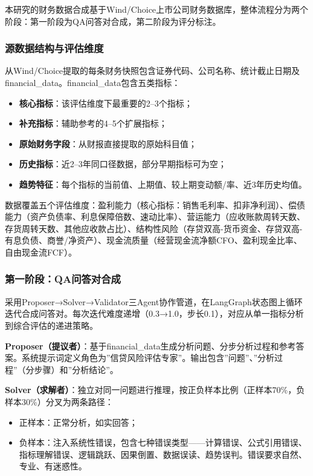 \documentclass[professional,privacy,print,win,long,STEM,AutoFakeBold]{def/buaa}
\begin{document}
本研究的财务数据合成基于Wind/Choice上市公司财务数据库，整体流程分为两个阶段：第一阶段为QA问答对合成，第二阶段为评分标注。

\subsubsection{源数据结构与评估维度}

从Wind/Choice提取的每条财务快照包含证券代码、公司名称、统计截止日期及financial\_data。financial\_data包含五类指标：

\begin{itemize}
    \item \textbf{核心指标}：该评估维度下最重要的2--3个指标；
    \item \textbf{补充指标}：辅助参考的4--5个扩展指标；
    \item \textbf{原始财务字段}：从财报直接提取的原始科目值；
    \item \textbf{历史指标}：近2--3年同口径数据，部分早期指标可为空；
    \item \textbf{趋势特征}：每个指标的当前值、上期值、较上期变动额/率、近3年历史均值。
\end{itemize}

数据覆盖五个评估维度：盈利能力（核心指标：销售毛利率、扣非净利润）、偿债能力（资产负债率、利息保障倍数、速动比率）、营运能力（应收账款周转天数、存货周转天数、其他应收款占比）、结构性风险（存贷双高-货币资金、存贷双高-有息负债、商誉/净资产）、现金流质量（经营现金流净额CFO、盈利现金比率、自由现金流FCF）。

\subsubsection{第一阶段：QA问答对合成}

采用Proposer→Solver→Validator三Agent协作管道，在LangGraph状态图上循环迭代合成问答对。每次迭代难度递增（0.3→1.0，步长0.1），对应从单一指标分析到综合评估的递进策略。

\textbf{Proposer（提议者）}：基于financial\_data生成分析问题、分步分析过程和参考答案。系统提示词定义角色为”信贷风险评估专家”。输出包含”问题”、”分析过程”（分步骤）和”分析结论”。

\textbf{Solver（求解者）}：独立对同一问题进行推理，按正负样本比例（正样本70\%，负样本30\%）分叉为两条路径：
\begin{itemize}
    \item 正样本：正常分析，如实回答；
    \item 负样本：注入系统性错误，包含七种错误类型——计算错误、公式引用错误、指标理解错误、逻辑跳跃、因果倒置、数据误读、趋势误判。错误要求自然、专业、有迷惑性。
\end{itemize}
\end{document}
